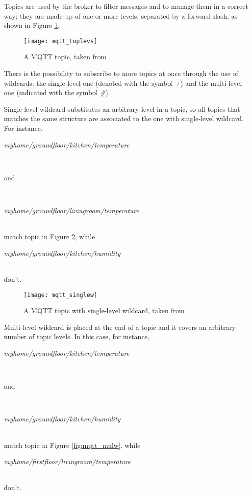 Topics are used by the broker to filter messages and to manage them in a correct way; they are made up of one or more levels, separated by a forward slash, as shown in Figure \ref{fig::topic}.

\begin{figure}[ht]

    \centering
    \texttt{[image: mqtt\_toplevs]}
    \caption[A MQTT topic]{A MQTT topic, taken from \cite{site:hivemq}}
    \label{fig::topic}

\end{figure}

There is the possibility to subscribe to more topics at once through the use of wildcards: the single-level one (denoted with the symbol \textit{+}) and the multi-level one (indicated with the symbol \textit{\#}).

Single-level wildcard substitutes an arbitrary level in a topic, so all topics that matches the same structure are associated to the one with single-level wildcard.
For instance,\\
\centerline{\textit{myhome\slash{}groundfloor\slash{}kitchen\slash{}temperature}}\\
\centerline{and}\\
\centerline{\textit{myhome\slash{}groundfloor\slash{}livingroom\slash{}temperature}}\\
match topic in Figure \ref{fig:mqtt_singlew}, while\\
\centerline{\textit{myhome\slash{}groundfloor\slash{}kitchen\slash{}humidity}}\\
don't.

\begin{figure}[htb]

    \centering
    \texttt{[image: mqtt\_singlew]}
    \caption[A MQTT topic with single-level wildcard]{A MQTT topic with single-level wildcard, taken from \cite{site:hivemq}}
    \label{fig:mqtt_singlew}

\end{figure}

Multi-level wildcard is placed at the end of a topic and it covers an arbitrary number of topic levels.
In this case, for instance,\\
\centerline{\textit{myhome\slash{}groundfloor\slash{}kitchen\slash{}tem\-per\-a\-ture}}\\
\centerline{and}\\
\centerline{\textit{myhome\slash{}groundfloor\slash{}kitchen\slash{}humidity}}\\
match topic in Figure \ref{fig:mqtt_mulw}, while\\
\centerline{\textit{myhome\slash{}firstfloor\slash{}livingroom\slash{}temperature}}\\
don't.

